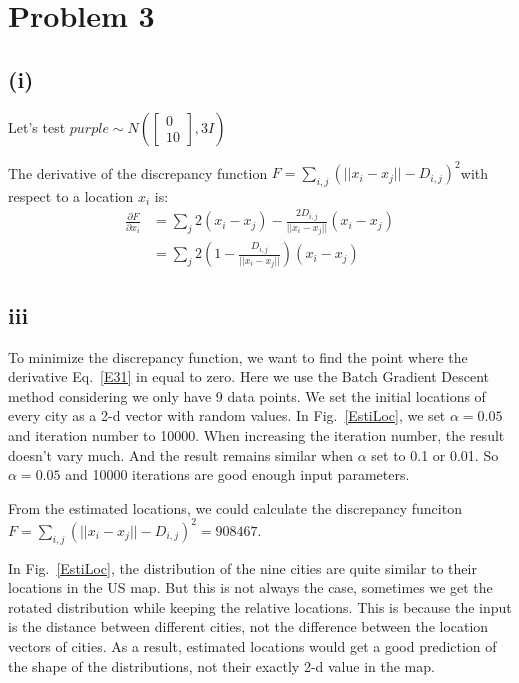 \documentclass[twoside,11pt]{homework}
\date{\today} %
\begin{document}
\maketitle

\section*{Problem 3}
\color{black}
\subsection*{(i)}
Let's test $purple \sim N(\left[ \begin{smallmatrix} 0\\10\end{smallmatrix}\right], 3I)$


The derivative of the discrepancy function $F = \sum_{i, j} (||x_i - x_j||-D_{i,j})^2$with respect to a location $x_i$ is:
%
\begin{equation}
\begin{split}
\frac{\partial F}{\partial x_i} &= \sum_{j} 2(x_i - x_j) - \frac{2D_{i,j}}{||x_i - x_j||}(x_i - x_j) \\
&=\sum_{j} 2(1-\frac{D_{i,j}}{||x_i - x_j||})(x_i - x_j) 
\end{split}
\label{E31}
\end{equation}
 
 \newpage
 \subsection*{iii}
 To minimize the discrepancy function, we want to find the point where the derivative Eq.~\ref{E31} in equal to zero.
 Here we use the Batch Gradient Descent method considering we only have 9 data points.
 We set the initial locations of every city as a 2-d vector with random values.
In Fig.~\ref{EstiLoc}, we set $\alpha = 0.05$ and iteration number to 10000.
When increasing the iteration number, the result doesn't vary much.
And the result remains similar when $\alpha $ set to 0.1 or 0.01.
So  $\alpha = 0.05$  and 10000 iterations are good enough input parameters.

From the estimated locations, we could calculate the discrepancy funciton $F = \sum_{i, j} (||x_i - x_j||-D_{i,j})^2 = 908467$.

In Fig.~\ref{EstiLoc}, the distribution of the nine cities are quite similar to their locations in the US map.
But this is not always the case, sometimes we get the rotated distribution while keeping the relative locations.
This is because the input is the distance between different cities, not the difference between the location vectors of cities.
As a result, estimated locations would get a good prediction of the shape of the distributions, not their exactly 2-d value in the map.
\end{document}
